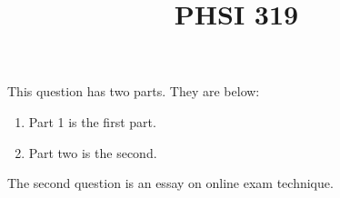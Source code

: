 \documentclass[anycalculator]{online_exam}
\title{PHSI 319}
\begin{document}
\begin{exam}  

\begin{question}
This question has two parts. They are below:
\begin{enumerate}
\item Part 1 is the first part.
\item Part two is the second.
\end{enumerate}


\end{question}
\begin{question}


The second question is an essay on online exam technique.

\end{question}

\end{exam}
\end{document}

